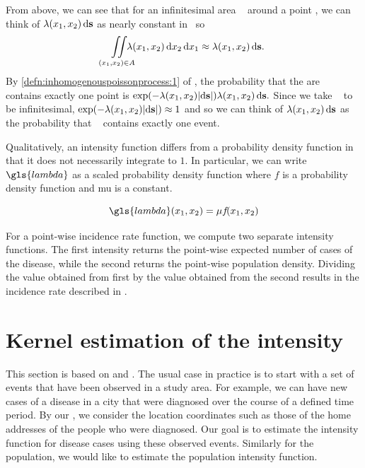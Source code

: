 From above, we can see that for an infinitesimal area \ds~ around a point \xvec,
we can think of $\lambda (x_1, x_2) \mathop{}\!\mathrm{d}{\mathbf{s}}$ as nearly constant in \ds~so
$$\iint\limits_{(x_1, x_2) \in A}{\hspace{-1em}\lambda (x_1, x_2) \mathop{}\!\mathrm{d}{x_2} \mathop{}\!\mathrm{d}{x_1}} \approx \lambda (x_1, x_2) \mathop{}\!\mathrm{d}{\mathbf{s}} \text{.}$$
By \cref{defn:inhomogenouspoissonprocess:1} of ,
the probability that the are \ds~ contains exactly one point is
$\exp(-\lambda (x_1, x_2) |\!\mathop{}\!\mathrm{d}{\mathbf{s}}|) \lambda (x_1, x_2) \mathop{}\!\mathrm{d}{\mathbf{s}} \text{.}$
Since we take \ds~ to be infinitesimal,
$\exp(-\lambda (x_1, x_2) |\!\mathop{}\!\mathrm{d}{\mathbf{s}}|) \allowbreak \approx 1$ and so we can think of
$\lambda (x_1, x_2) \mathop{}\!\mathrm{d}{\mathbf{s}}$ as the probability that \ds~ contains exactly one event.

Qualitatively,
an intensity function differs from a probability density function in that it does not necessarily integrate to $1$.
In particular, we can write $\gls{lambda}$ as a scaled probability density function
where $f$ is a probability density function and \gls{mu} is a constant.

\begin{equation}
    \label{eq:lambda_mu}
    \gls{lambda}\xvec = \mu f\!\xvec
\end{equation}

For a point-wise \gls{incidence rate} function,
we compute two separate \gls{intensity} functions.
The first \gls{intensity} returns the point-wise expected number of cases of the disease,
while the second returns the point-wise population density.
Dividing the value obtained from first by the value obtained from the second results in the \gls{incidence rate} described in .

\section{Kernel estimation of the intensity}
\label{sec:theory:kernelestimation}

This section is based on \citet{silverman1986density} and \citet{wand1994kernel}.
The usual case in practice is to start with a set of \glspl{event} that have been observed in a study area.
For example, we can have new cases of a disease in a city that were diagnosed over the course of a defined time period.
By our ,
we consider the location coordinates such as those of the home addresses of the people who were diagnosed.
Our goal is to estimate the \gls{intensity} function for disease cases using these observed \glspl{event}.
Similarly for the population,
we would like to estimate the population \gls{intensity} function.

